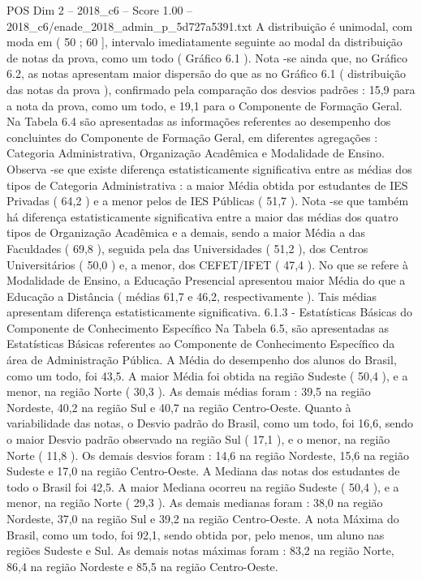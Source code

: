 \begin{textsample}{POS Dim 2 – 2018\_c6 – Score 1.00 – 2018\_c6/enade\_2018\_admin\_p\_5d727a5391.txt}
A distribuição é unimodal, com moda em ( 50 ; 60 ], intervalo imediatamente seguinte ao modal da distribuição de notas da prova, como um todo ( Gráfico 6.1 ).
Nota -se ainda que, no Gráfico 6.2, as notas apresentam maior dispersão do que as no Gráfico 6.1 ( distribuição das notas da prova ), confirmado pela comparação dos desvios padrões : 15,9 para a nota da prova, como um todo, e 19,1 para o Componente de Formação Geral.
Na Tabela 6.4 são apresentadas as informações referentes ao desempenho dos concluintes do Componente de Formação Geral, em diferentes agregações : Categoria Administrativa, Organização Acadêmica e Modalidade de Ensino.
Observa -se que existe diferença estatisticamente significativa entre as médias dos tipos de Categoria Administrativa : a maior Média obtida por estudantes de IES Privadas ( 64,2 ) e a menor pelos de IES Públicas ( 51,7 ).
Nota -se que também há diferença estatisticamente significativa entre a maior das médias dos quatro tipos de Organização Acadêmica e a demais, sendo a maior Média a das Faculdades ( 69,8 ), seguida pela das Universidades ( 51,2 ), dos Centros Universitários ( 50,0 ) e, a menor, dos CEFET/IFET ( 47,4 ).
No que se refere à Modalidade de Ensino, a Educação Presencial apresentou maior Média do que a Educação a Distância ( médias 61,7 e 46,2, respectivamente ).
Tais médias apresentam diferença estatisticamente significativa. 6.1.3 - Estatísticas Básicas do Componente de Conhecimento Específico Na Tabela 6.5, são apresentadas as Estatísticas Básicas referentes ao Componente de Conhecimento Específico da área de Administração Pública.
A Média do desempenho dos alunos do Brasil, como um todo, foi 43,5.
A maior Média foi obtida na região Sudeste ( 50,4 ), e a menor, na região Norte ( 30,3 ).
As demais médias foram : 39,5 na região Nordeste, 40,2 na região Sul e 40,7 na região Centro-Oeste.
Quanto à variabilidade das notas, o Desvio padrão do Brasil, como um todo, foi 16,6, sendo o maior Desvio padrão observado na região Sul ( 17,1 ), e o menor, na região Norte ( 11,8 ).
Os demais desvios foram : 14,6 na região Nordeste, 15,6 na região Sudeste e 17,0 na região Centro-Oeste.
A Mediana das notas dos estudantes de todo o Brasil foi 42,5.
A maior Mediana ocorreu na região Sudeste ( 50,4 ), e a menor, na região Norte ( 29,3 ).
As demais medianas foram : 38,0 na região Nordeste, 37,0 na região Sul e 39,2 na região Centro-Oeste.
A nota Máxima do Brasil, como um todo, foi 92,1, sendo obtida por, pelo menos, um aluno nas regiões Sudeste e Sul.
As demais notas máximas foram : 83,2 na região Norte, 86,4 na região Nordeste e 85,5 na região Centro-Oeste.

\end{textsample}
